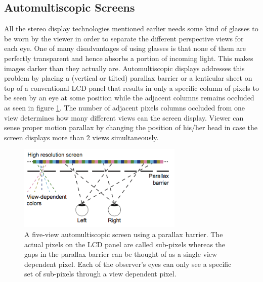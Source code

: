 \subsection{Automultiscopic Screens}

All the stereo display technologies mentioned earlier needs some kind of glasses to be worn by the viewer in order to separate the different perspective views for each eye. One of many disadvantages of using glasses is that none of them are perfectly transparent and hence absorbs a portion of incoming light. This makes images darker than they actually are. Automultiscopic displays addresses this problem by placing a (vertical or tilted) parallax barrier or a lenticular sheet on top of a conventional LCD panel that results in only a specific column of pixels to be seen by an eye at some position while the adjacent columns remains occluded as seen in figure \ref{fig:parallax_barrier}\cite{zwicker2006antialiasing}. The number of adjacent pixels columns occluded from one view determines how many different views can the screen display. Viewer can sense proper motion parallax by changing the position of his/her head in case the screen displays more than 2 views simultaneously.
\begin{figure}
\centering
    \includegraphics[width=0.7\textwidth]{./Template_Figures/parallax_barrier}
    \caption{A five-view automultiscopic screen using a parallax barrier. The actual pixels on the LCD panel are called sub-pixels whereas the gaps in the parallax barrier can be thought of as a single view dependent pixel. Each of the observer's eyes can only see a specific set of sub-pixels through a view dependent pixel\cite{zwicker2006antialiasing}.\label{fig:parallax_barrier}}
\end{figure}

